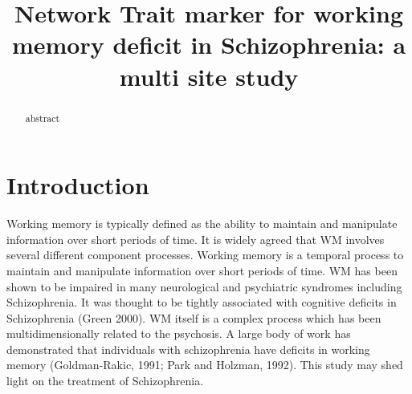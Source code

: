 \documentclass[preprint,authoryear,review,12pt]{elsarticle}
\begin{document}
\begin{frontmatter}

\title{Network Trait marker for working memory deficit in Schizophrenia: a multi site study
}



%






\begin{abstract} 
abstract
\end{abstract}

\begin{keyword}
\end{keyword}

\end{frontmatter}
%
%
\newpage





\section*{Introduction}

Working memory is typically defined as the ability to maintain and manipulate information over short periods of time. It is widely agreed that WM involves several different component processes. Working memory is a temporal process to maintain and manipulate information over short periods of time. WM has been shown to be impaired in many neurological and psychiatric syndromes including Schizophrenia. It was thought to be tightly associated with cognitive deficits in Schizophrenia (Green 2000). WM itself is a complex process which has been multidimensionally related to the psychosis. A large body of work has demonstrated that individuals with schizophrenia have deficits in working memory (Goldman-Rakic, 1991; Park and Holzman, 1992). This study may shed light on the treatment of Schizophrenia. 
\end{document}
